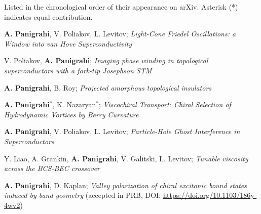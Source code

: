 

\begin{cventries}

  \cventry
    {Listed in the chronological order of their appearance on arXiv. Asterisk (*) indicates equal contribution.} %
    {} %
    {} %
    {} %
    {
	  \begin{cvitems} %
	    \item{\textbf{A. Panigrahi}, V. Poliakov, L. Levitov; \textit{Light-Cone Friedel Oscillations: a Window into van Hove Superconductivity} }
	  	\item{V. Poliakov, \textbf{A. Panigrahi}; \textit{Imaging phase winding in topological superconductors with a fork-tip Josephson STM} }
		\item{\textbf{A. Panigrahi}, B. Roy; \textit{Projected amorphous topological insulators} }
	  	\item{\textbf{A. Panigrahi}$^{*}$, K. Nazaryan$^{*}$; \textit{Viscochiral Transport: Chiral Selection of Hydrodynamic Vortices by Berry Curvature} }
	  	\item{\textbf{A. Panigrahi}, V. Poliakov, L. Levitov; \textit{Particle-Hole Ghost Interference in Superconductors} }
	  	\item{Y. Liao, A. Grankin, \textbf{A. Panigrahi}, V. Galitski, L. Levitov; \textit{Tunable viscosity across the BCS-BEC crossover} }
	  	\item{\textbf{A. Panigrahi}, D. Kaplan; \textit{Valley polarization of chiral excitonic bound states induced by band geometry}  (accepted in PRB, DOI: \url{https://doi.org/10.1103/186y-4wv2})}

\end{cvitems}}
\end{cventries}
